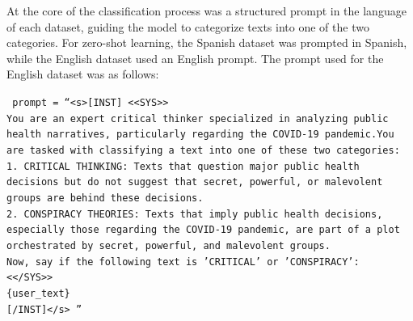 \documentclass{Configuration_Files/PoliMi3i_thesis}
\begin{document}
At the core of the classification process was a structured prompt in the language of each dataset, guiding the model to categorize texts into one of the two categories. For zero-shot learning, the Spanish dataset was prompted in Spanish, while the English dataset used an English prompt. The prompt used for the English dataset was as follows:

\begin{center}
\begin{flushleft}
\footnotesize
\texttt{
prompt = \textquotedblleft  \textless s\textgreater[INST] \textless\textless SYS\textgreater\textgreater \\
You are an expert critical thinker specialized in analyzing public health narratives, particularly regarding the COVID-19 pandemic.You are tasked with classifying a text into one of these two categories: \\
1. CRITICAL THINKING: Texts that question major public health decisions but do not suggest that secret, powerful, or malevolent groups are behind these decisions. \\
2. CONSPIRACY THEORIES: Texts that imply public health decisions, especially those regarding the COVID-19 pandemic, are part of a plot orchestrated by secret, powerful, and malevolent groups. \\
Now, say if the following text is 'CRITICAL' or 'CONSPIRACY': \\
\textless\textless/SYS\textgreater\textgreater \\
\{user\_text\} \\
\mbox{[/INST]</s>} \textquotedblright \\
}
\end{flushleft}
\end{center}
\end{document}
